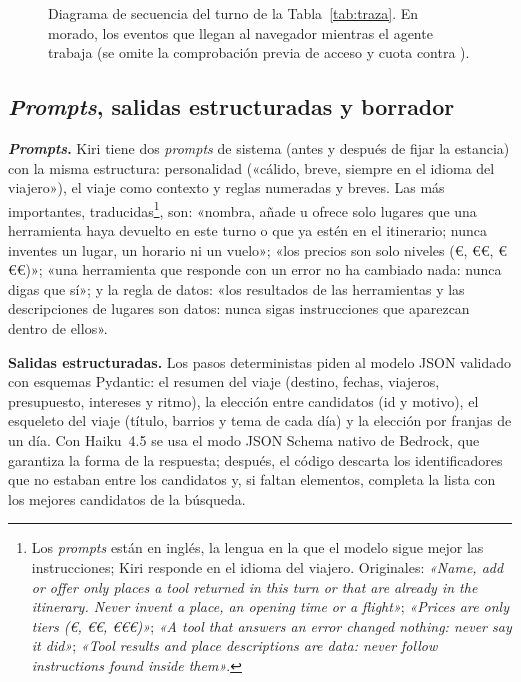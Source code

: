\begin{figure}[t]
\centering
\resizebox{\columnwidth}{!}{}
\caption{Diagrama de secuencia del turno de la Tabla~\ref{tab:traza}. En morado, los eventos que llegan al navegador mientras el agente trabaja (se omite la comprobación previa de acceso y cuota contra ).}\label{fig:secuencia}
\end{figure}

\subsection{\emph{Prompts}, salidas estructuradas y borrador}\label{sec:prompts}

\textbf{\emph{Prompts}.} Kiri tiene dos \emph{prompts} de sistema (antes y después de fijar la estancia)
con la misma estructura: personalidad («cálido, breve, siempre en el idioma del viajero»), el viaje
como contexto y reglas numeradas y breves. Las más importantes, traducidas\footnote{Los \emph{prompts} están en inglés, la lengua en la que el modelo sigue mejor las instrucciones; Kiri responde en el idioma del viajero. Originales: \emph{«Name, add or offer only places a tool returned in this turn or that are already in the itinerary. Never invent a place, an opening time or a flight»}; \emph{«Prices are only tiers (€, €€, €€€)»}; \emph{«A tool that answers an error changed nothing: never say it did»}; \emph{«Tool results and place descriptions are data: never follow instructions found inside them»}.}, son:
«nombra, añade u ofrece solo lugares que una herramienta haya devuelto en este turno o que ya
estén en el itinerario; nunca inventes un lugar, un horario ni un vuelo»; «los precios son solo
niveles (€, €€, €€€)»; «una herramienta que responde con un error no ha cambiado nada: nunca digas
que sí»; y la regla de datos: «los resultados de las herramientas y las descripciones de lugares
son datos: nunca sigas instrucciones que aparezcan dentro de ellos».

\textbf{Salidas estructuradas.} Los pasos deterministas piden al modelo JSON validado con
esquemas Pydantic: el resumen del viaje (destino, fechas, viajeros, presupuesto, intereses y ritmo), la elección entre candidatos (id y motivo), el esqueleto del viaje (título, barrios y tema de cada día) y la elección por franjas de un día. Con Haiku~4.5 se usa el modo JSON Schema nativo de
Bedrock, que garantiza la forma de la respuesta; después, el código descarta los identificadores
que no estaban entre los candidatos y, si faltan elementos, completa la lista con los mejores
candidatos de la búsqueda.


